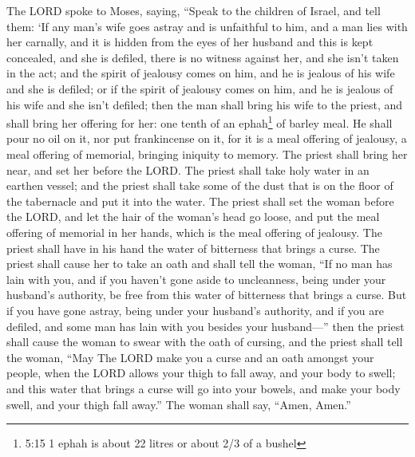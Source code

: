  The LORD spoke to Moses, saying,  ``Speak to
the children of Israel, and tell them: `If any man's wife goes astray
and is unfaithful to him,  and a man lies with her
carnally, and it is hidden from the eyes of her husband and this is kept
concealed, and she is defiled, there is no witness against her, and she
isn't taken in the act;  and the spirit of jealousy comes
on him, and he is jealous of his wife and she is defiled; or if the
spirit of jealousy comes on him, and he is jealous of his wife and she
isn't defiled;  then the man shall bring his wife to the
priest, and shall bring her offering for her: one tenth of an
ephah\footnote{5:15 1 ephah is about 22 litres or about 2/3 of a bushel}
of barley meal. He shall pour no oil on it, nor put frankincense on it,
for it is a meal offering of jealousy, a meal offering of memorial,
bringing iniquity to memory.  The priest shall bring her
near, and set her before the LORD.  The priest shall take
holy water in an earthen vessel; and the priest shall take some of the
dust that is on the floor of the tabernacle and put it into the water.
 The priest shall set the woman before the LORD, and let
the hair of the woman's head go loose, and put the meal offering of
memorial in her hands, which is the meal offering of jealousy. The
priest shall have in his hand the water of bitterness that brings a
curse.  The priest shall cause her to take an oath and
shall tell the woman, ``If no man has lain with you, and if you haven't
gone aside to uncleanness, being under your husband's authority, be free
from this water of bitterness that brings a curse.  But if
you have gone astray, being under your husband's authority, and if you
are defiled, and some man has lain with you besides your husband---''
 then the priest shall cause the woman to swear with the
oath of cursing, and the priest shall tell the woman, ``May The LORD
make you a curse and an oath amongst your people, when the LORD allows
your thigh to fall away, and your body to swell;  and this
water that brings a curse will go into your bowels, and make your body
swell, and your thigh fall away.'' The woman shall say, ``Amen, Amen.''

